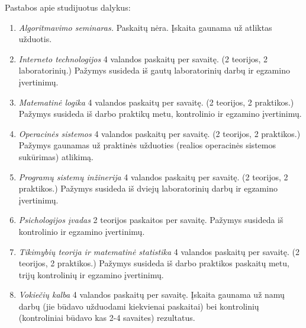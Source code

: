Pastabos apie studijuotus dalykus:
\begin{enumerate}
  \item
    \label{note:algoritmavimo_seminaras}
    \emph{Algoritmavimo seminaras.} 
    Paskaitų nėra. Įskaita gaunama už atliktas užduotis.
  \item
    \label{note:interneto_technologijos}
    \emph{Interneto technologijos}
    4 valandos paskaitų per savaitę. (2 teorijos, 2 laboratorinių.)
    Pažymys susideda iš gautų laboratorinių darbų ir egzamino 
    įvertinimų.
  \item
    \label{note:matematine_logika}
    \emph{Matematinė logika}
    4 valandos paskaitų per savaitę. (2 teorijos, 2 praktikos.)
    Pažymys susideda iš darbo praktikų metu, kontrolinio ir egzamino
    įvertinimų.
  \item
    \label{note:operacines_sistemos}
    \emph{Operacinės sistemos}
    4 valandos paskaitų per savaitę. (2 teorijos, 2 praktikos.)
    Pažymys gaunamas už praktinės užduoties (realios operacinės
    sistemos sukūrimas) atlikimą.
  \item
    \label{note:programu_sistemu_inzinerija}
    \emph{Programų sistemų inžinerija}
    4 valandos paskaitų per savaitę. (2 teorijos, 2 praktikos.)
    Pažymys susideda iš dviejų laboratorinių darbų ir egzamino įvertinimų.
  \item
    \label{note:psichologijos_ivadas}
    \emph{Psichologijos įvadas}
    2 teorijos paskaitos per savaitę.
    Pažymys susideda iš kontrolinio ir egzamino įvertinimų.
  \item
    \label{note:tikimybiu_teorija}
    \emph{Tikimybių teorija ir matematinė statistika}
    4 valandos paskaitų per savaitę. (2 teorijos, 2 praktikos.)
    Pažymys susideda iš darbo praktikos paskaitų metu, trijų kontrolinių
    ir egzamino įvertinimų.
  \item 
    \label{note:vokieciu_kalba}
    \emph{Vokiečių kalba}
    4 valandos paskaitų per savaitę.
    Įskaita gaunama už namų darbų (jie būdavo užduodami kiekvienai
    paskaitai) bei kontrolinių (kontroliniai būdavo kas 2-4 savaites)
    rezultatus.
\end{enumerate}
